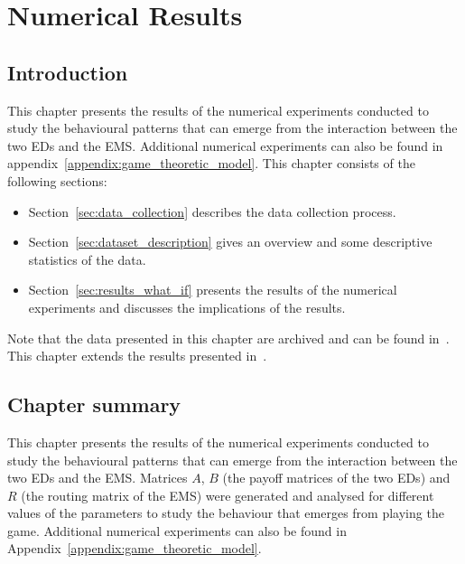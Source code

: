 \chapter{Numerical Results}\label{sec:numerical_results}

\section{Introduction}

This chapter presents the results of the numerical experiments conducted to
study the behavioural patterns that can emerge from the interaction between the
two EDs and the EMS.
Additional numerical experiments can also be found in
appendix~\ref{appendix:game_theoretic_model}.
This chapter consists of the following sections:
\begin{itemize}
    \item Section~\ref{sec:data_collection} describes the data collection
    process.
    \item Section~\ref{sec:dataset_description} gives an overview and some
    descriptive statistics of the data.
    \item Section~\ref{sec:results_what_if} presents the results of the
    numerical experiments and discusses the implications of the results.
\end{itemize}

Note that the data presented in this chapter are archived and can be found
in~\cite{michalis_panayides_2023_7555285}.
This chapter extends the results presented in~\cite{panayides2023game}.









\section{Chapter summary}

This chapter presents the results of the numerical experiments conducted to
study the behavioural patterns that can emerge from the interaction between the
two EDs and the EMS.
Matrices \(A\), \(B\) (the payoff matrices of the two EDs) and \(R\) (the
routing matrix of the EMS) were generated and analysed for different values of
the parameters to study the behaviour that emerges from playing the game.
Additional numerical experiments can also be found in
Appendix~\ref{appendix:game_theoretic_model}.

